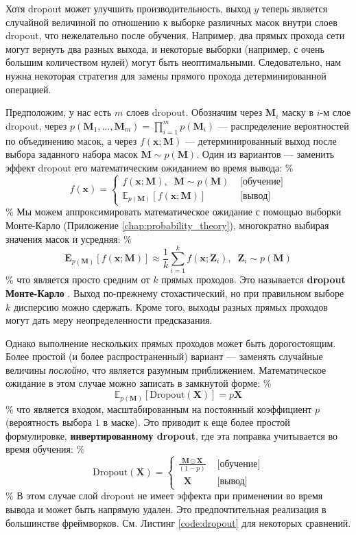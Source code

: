 Хотя dropout может улучшить производительность, выход $y$ теперь является случайной величиной по отношению к выборке различных масок внутри слоев dropout, что нежелательно после обучения. Например, два прямых прохода сети могут вернуть два разных выхода, и некоторые выборки (например, с очень большим количеством нулей) могут быть неоптимальными. Следовательно, нам нужна некоторая стратегия для замены прямого прохода детерминированной операцией. 

Предположим, у нас есть $m$ слоев dropout. Обозначим через $\mathbf{M}_i$ маску в $i$-м слое dropout, через $p(\mathbf{M}_1, \ldots, \mathbf{M}_m) = \prod_{i=1}^m p(\mathbf{M}_i)$ — распределение вероятностей по объединению масок, а через $f(\mathbf{x}; \mathbf{M})$ — детерминированный выход после выбора заданного набора масок $\mathbf{M} \sim p(\mathbf{M})$. Один из вариантов — заменить эффект dropout его математическим ожиданием во время вывода:
\%
$$
f(\mathbf{x})=\begin{cases} f(\mathbf{x}; \mathbf{M}), \;\; \mathbf{M}\sim p(\mathbf{M}) & \texttt{ [обучение]} \\ \mathbb{E}_{p(\mathbf{M})}\left[f(\mathbf{x}; \mathbf{M})\right]  & \texttt{ [вывод]}\end{cases}
$$
\%
Мы можем аппроксимировать математическое ожидание с помощью выборки Монте-Карло (Приложение \ref{chap:probability_theory}), многократно выбирая значения масок и усредняя:
\%
$$
\mathbf{E}_{p(\mathbf{M})}\left[f(\mathbf{x}; \mathbf{M})\right] \approx \frac{1}{k}\sum_{i=1}^k f(\mathbf{x}; \mathbf{Z}_i),\;\; \mathbf{Z}_i \sim p(\mathbf{M})
$$
\%
что является просто средним от $k$ прямых проходов. Это называется \textbf{dropout Монте-Карло} \cite{gal2016dropout}. Выход по-прежнему стохастический, но при правильном выборе $k$ дисперсию можно сдержать. Кроме того, выходы разных прямых проходов могут дать меру неопределенности предсказания. 

Однако выполнение нескольких прямых проходов может быть дорогостоящим. Более простой (и более распространенный) вариант — заменять случайные величины \textit{послойно}, что является разумным приближением. Математическое ожидание в этом случае можно записать в замкнутой форме:
\%
$$
\mathbb{E}_{p(\mathbf{M})}\left[\text{Dropout}(\mathbf{X})\right]=p\mathbf{X}
$$
\%
что является входом, масштабированным на постоянный коэффициент $p$ (вероятность выбора $1$ в маске). Это приводит к еще более простой формулировке, \textbf{инвертированному dropout}, где эта поправка учитывается во время обучения:
\%
$$
\text{Dropout}(\mathbf{X})=\begin{cases} \displaystyle\frac{\mathbf{M}\odot\mathbf{X}}{(1-p)} & \texttt{ [обучение]} \\ \;\;\mathbf{X}  & \texttt{ [вывод]}\end{cases}
$$
\%
В этом случае слой dropout не имеет эффекта при применении во время вывода и может быть напрямую удален. Это предпочтительная реализация в большинстве фреймворков. См. Листинг \ref{code:dropout} для некоторых сравнений.

